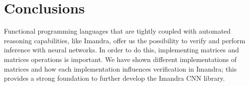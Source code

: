 \documentclass[runningheads]{llncs}
\begin{document}
\section{Conclusions}
Functional programming languages that are tightly coupled with automated reasoning capabilities, like Imandra, offer us the possibility to verify and perform inference with neural networks. In order to do this, implementing matrices and matrices operations is important.
We have shown different implementations of matrices and how each implementation influences verification in Imandra; this provides a strong foundation to further develop the Imandra CNN library.


%
%


\end{document}
